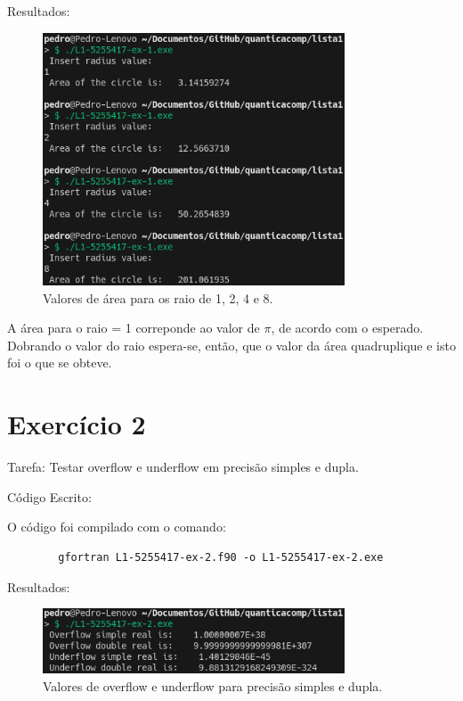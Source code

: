 \documentclass[12pt, a4paper]{article} %
\begin{document}
    Resultados:
    \begin{figure}[H]
        \centering
        \includegraphics[width=0.8\textwidth]{../images/results-ex1.png}
        \caption{Valores de \'area para os raio de 1, 2, 4 e 8.}
    \end{figure}

    A \'area para o raio = 1 correponde ao valor de $\pi$, de acordo com o esperado. Dobrando o valor do raio espera-se, então, que o valor da \'area quadruplique e isto foi o que se obteve.

\section{Exerc\'icio 2}

    Tarefa: Testar overflow e underflow em precis\~ao simples e dupla.

    C\'odigo Escrito:
    

    O c\'odigo foi compilado com o comando:
    \begin{verbatim}
        gfortran L1-5255417-ex-2.f90 -o L1-5255417-ex-2.exe
    \end{verbatim}

    Resultados:
    \begin{figure}[H]
        \centering
        \includegraphics[width=0.8\textwidth]{../images/results-ex2.png}
        \caption{Valores de overflow e underflow para precis\~ao simples e dupla.}
    \end{figure}
\end{document}
